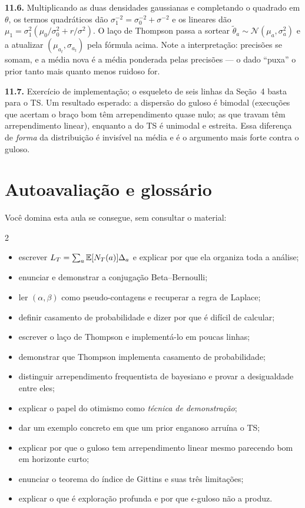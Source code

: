 \documentclass[11pt, a4paper]{article}
\newcommand{\Nrm}{\mathcal{N}}
\begin{document}
\medskip
\textbf{11.6.} Multiplicando as duas densidades gaussianas e completando o
quadrado em $\theta$, os termos quadráticos dão
$\sigma_1^{-2} = \sigma_0^{-2} + \sigma^{-2}$ e os lineares dão
$\mu_1 = \sigma_1^2(\mu_0/\sigma_0^2 + r/\sigma^2)$. O laço de Thompson passa a
sortear $\tilde\theta_a \sim \Nrm(\mu_a, \sigma_a^2)$ e a atualizar
$(\mu_{a_t}, \sigma_{a_t})$ pela fórmula acima. Note a interpretação: precisões
se somam, e a média nova é a média ponderada pelas precisões — o dado ``puxa''
o prior tanto mais quanto menos ruidoso for.

\medskip
\textbf{11.7.} Exercício de implementação; o esqueleto de seis linhas da
Seção~4 basta para o TS. Um resultado esperado: a dispersão do guloso é
bimodal (execuções que acertam o braço bom têm arrependimento quase nulo;
as que travam têm arrependimento linear), enquanto a do TS é unimodal e
estreita. Essa diferença de \emph{forma} da distribuição é invisível na média
e é o argumento mais forte contra o guloso.

\section{Autoavaliação e glossário}

\noindent Você domina esta aula se consegue, sem consultar o material:

\begin{multicols}{2}
{\footnotesize
\begin{itemize}[leftmargin=1.5em, itemsep=0.3ex, topsep=0.2ex, label=$\square$]
  \item escrever $L_T = \sum_a \mathbb{E}[N_T(a)]\Delta_a$ e explicar por que ela
        organiza toda a análise;
  \item enunciar e demonstrar a conjugação Beta--Bernoulli;
  \item ler $(\alpha,\beta)$ como pseudo-contagens e recuperar a regra de
        Laplace;
  \item definir casamento de probabilidade e dizer por que é difícil de
        calcular;
  \item escrever o laço de Thompson e implementá-lo em poucas linhas;
  \item demonstrar que Thompson implementa casamento de probabilidade;
  \item distinguir arrependimento frequentista de bayesiano e provar a
        desigualdade entre eles;
  \item explicar o papel do otimismo como \emph{técnica de demonstração};
  \item dar um exemplo concreto em que um prior enganoso arruína o TS;
  \item explicar por que o guloso tem arrependimento linear mesmo parecendo
        bom em horizonte curto;
  \item enunciar o teorema do índice de Gittins e suas três limitações;
  \item explicar o que é exploração profunda e por que $\epsilon$-guloso não a
        produz.
\end{itemize}}
\end{multicols}
\end{document}
